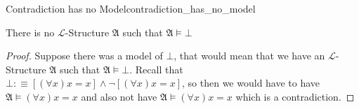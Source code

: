 \begin{proposition}{Contradiction has no Model}{contradiction_has_no_model}
    \begin{center}
        There is no $\mathcal{L}$-Structure $ \mathfrak{ A }   $ such that $ \mathfrak{ A } \models \bot $ 
    \end{center}
\end{proposition}
\begin{proof}
    Suppose there was a model of $ \bot $, that would mean that we have an $\mathcal{L}$-Structure $ \mathfrak{ A }     $ such that $ \mathfrak{ A } \models \bot  $. Recall that $ \bot :\equiv \left[ \left( \forall x \right) x =  x \right] \land \neg \left[ \left( \forall x \right)x =  x \right] $, so then we would have to have $ \mathfrak{ A } \models  \left( \forall x \right)x =  x   $ and also not have $ \mathfrak{ A } \models \left( \forall x \right) x =  x  $ which is a contradiction.
\end{proof}
